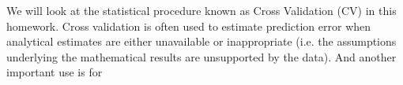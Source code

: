 \documentclass{article}
\begin{document}
We will look at the statistical procedure known as Cross Validation
(CV) in this homework.  Cross validation is often used to estimate
prediction error when analytical estimates are either unavailable or
inappropriate (i.e. the assumptions underlying the mathematical
results are unsupported by the data).
And another important use is for 
\end{document}
